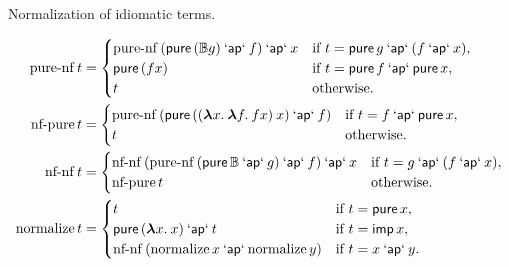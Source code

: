 \begin{algorithm}
\caption{Normalization of idiomatic terms.}
\label{alg:normalize}
\begin{align}
	\operatorname{pure-nf} t &= \begin{cases}
		\operatorname{pure-nf}{(\operatorname{\mathsf{pure}}{(\mathbb{B} g)} \mathbin{\mathsf{`ap`}} f)} \mathbin{\mathsf{`ap`}} x
			&\text{if } t = \operatorname{\mathsf{pure}} g \mathbin{\mathsf{`ap`}} (f \mathbin{\mathsf{`ap`}} x), \\
		\operatorname{\mathsf{pure}}{(f x)} &\text{if } t = \operatorname{\mathsf{pure}} f \mathbin{\mathsf{`ap`}} \operatorname{\mathsf{pure}} x, \\
		t &\text{otherwise.}
	\end{cases} \label{eq:pure-nf}\\
	\operatorname{nf-pure} t &= \begin{cases}
		\operatorname{pure-nf}{(\operatorname{\mathsf{pure}}{(({\boldsymbol\lambda} x.\>{\boldsymbol\lambda} f.\>f x) \> x)} \mathbin{\mathsf{`ap`}} f)}
			&\text{if } t = f \mathbin{\mathsf{`ap`}} \operatorname{\mathsf{pure}} x, \\
		t &\text{otherwise.}
	\end{cases} \label{eq:nf-pure}\\
	\operatorname{nf-nf} t &= \begin{cases}
		\operatorname{nf-nf}{(\operatorname{pure-nf}{(\operatorname{\mathsf{pure}} \mathbb{B} \mathbin{\mathsf{`ap`}} g)} \mathbin{\mathsf{`ap`}} f)} \mathbin{\mathsf{`ap`}} x
			&\text{if } t = g \mathbin{\mathsf{`ap`}} (f \mathbin{\mathsf{`ap`}} x), \\
		\operatorname{nf-pure} t &\text{otherwise.}
	\end{cases} \label{eq:nf-nf}\\
	\operatorname{normalize} t &= \begin{cases}
		t &\text{if } t = \operatorname{\mathsf{pure}} x, \\
		\operatorname{\mathsf{pure}}{({\boldsymbol\lambda} x.\>x)} \mathbin{\mathsf{`ap`}} t &\text{if } t = \operatorname{\mathsf{imp}} x, \\
		\operatorname{nf-nf}{(\operatorname{normalize} x \mathbin{\mathsf{`ap`}} \operatorname{normalize} y)}
			&\text{if } t = x \mathbin{\mathsf{`ap`}} y.
	\end{cases} \label{eq:normalize-def}
\end{align}
\end{algorithm}

